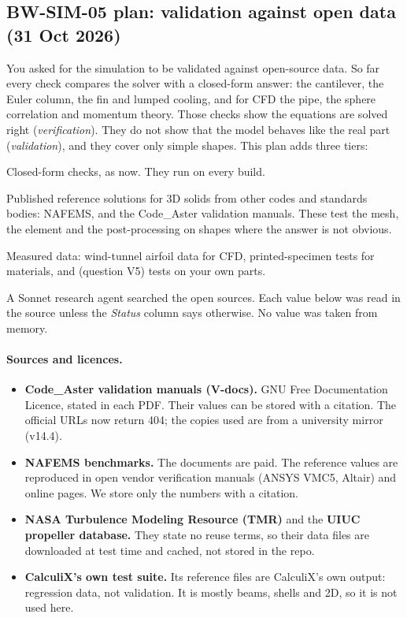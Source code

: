 \subsection{BW-SIM-05 plan: validation against open data (31 Oct 2026)}\label{sec:sim-validation-plan}

You asked for the simulation to be validated against open-source data. So far every check compares the solver
with a closed-form answer: the cantilever, the Euler column, the fin and lumped cooling, and for CFD the pipe,
the sphere correlation and momentum theory. Those checks show the equations are solved right
(\emph{verification}). They do not show that the model behaves like the real part (\emph{validation}), and
they cover only simple shapes. This plan adds three tiers:
\begin{description}[nosep,font=\normalfont\bfseries]
  \item[V --- verification.] Closed-form checks, as now. They run on every build.
  \item[B --- benchmarks.] Published reference solutions for 3D solids from other codes and standards bodies:
        NAFEMS, and the Code\_Aster validation manuals. These test the mesh, the element and the
        post-processing on shapes where the answer is not obvious.
  \item[E --- experiments.] Measured data: wind-tunnel airfoil data for CFD, printed-specimen tests for
        materials, and (question V5) tests on your own parts.
\end{description}
A Sonnet research agent searched the open sources. Each value below was read in the source unless the
\emph{Status} column says otherwise. No value was taken from memory.

\paragraph{Sources and licences.}
\begin{itemize}[nosep]
  \item \textbf{Code\_Aster validation manuals (V-docs).} GNU Free Documentation Licence, stated in each PDF.
        Their values can be stored with a citation. The official URLs now return 404; the copies used are from a
        university mirror (v14.4).
  \item \textbf{NAFEMS benchmarks.} The documents are paid. The reference values are reproduced in open vendor
        verification manuals (ANSYS VMC5, Altair) and online pages. We store only the numbers with a citation.
  \item \textbf{NASA Turbulence Modeling Resource (TMR)} and the \textbf{UIUC propeller database.} They state no
        reuse terms, so their data files are downloaded at test time and cached, not stored in the repo.
  \item \textbf{CalculiX's own test suite.} Its reference files are CalculiX's own output: regression data, not
        validation. It is mostly beams, shells and 2D, so it is not used here.
\end{itemize}

